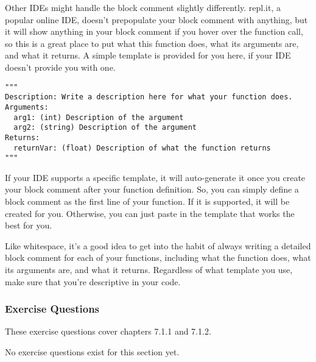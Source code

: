 Other IDEs might handle the block comment slightly differently. repl.it, a popular online IDE, doesn't prepopulate your block comment with anything, but it will show anything in your block comment if you hover over the function call, so this is a great place to put what this function does, what its arguments are, and what it returns. A simple template is provided for you here, if your IDE doesn't provide you with one.\par
\begin{lstlisting}[style=pippython]
"""
Description: Write a description here for what your function does.
Arguments:
  arg1: (int) Description of the argument
  arg2: (string) Description of the argument
Returns:
  returnVar: (float) Description of what the function returns
"""
\end{lstlisting}
If your IDE supports a specific template, it will auto-generate it once you create your block comment after your function definition. So, you can simply define a block comment as the first line of your function. If it is supported, it will be created for you. Otherwise, you can just paste in the template that works the best for you.\par
Like whitespace, it's a good idea to get into the habit of always writing a detailed block comment for each of your functions, including what the function does, what its arguments are, and what it returns. Regardless of what template you use, make sure that you're descriptive in your code.\par
\subsubsection*{Exercise Questions}
These exercise questions cover chapters 7.1.1 and 7.1.2.

No exercise questions exist for this section yet.
